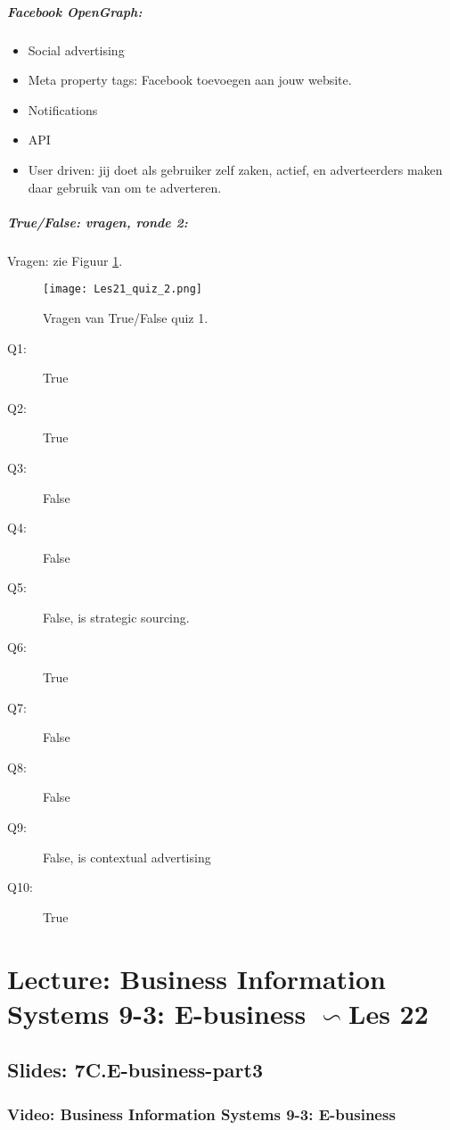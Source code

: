 \documentclass[10pt,a4paper]{report}
\begin{document}
\paragraph{Facebook OpenGraph:}
\begin{itemize}
\item Social advertising
\item Meta property tags: Facebook toevoegen aan jouw website.
\item Notifications
\item API
\item User driven: jij doet als gebruiker zelf zaken, actief, en adverteerders maken daar gebruik van om te adverteren.
\end{itemize}

\paragraph{True/False: vragen, ronde 2:} Vragen: zie Figuur \ref{Les21_2}.

\begin{figure}[ht!]
\centering
\texttt{[image: Les21\_quiz\_2.png]}
\caption{Vragen van True/False quiz 1. \label{Les21_2}}
\end{figure}

\begin{description}
\item[Q1:]True
\item[Q2:]True
\item[Q3:]False
\item[Q4:]False
\item[Q5:]False, is strategic sourcing.
\item[Q6:]True
\item[Q7:]False
\item[Q8:]False
\item[Q9:]False, is contextual advertising
\item[Q10:]True
\end{description}

\chapter{Lecture: Business Information Systems 9-3: E-business $\backsim$Les 22}
\section{Slides: 7C.E-business-part3}
\subsection{Video: Business Information Systems 9-3: E-business}
\end{document}
